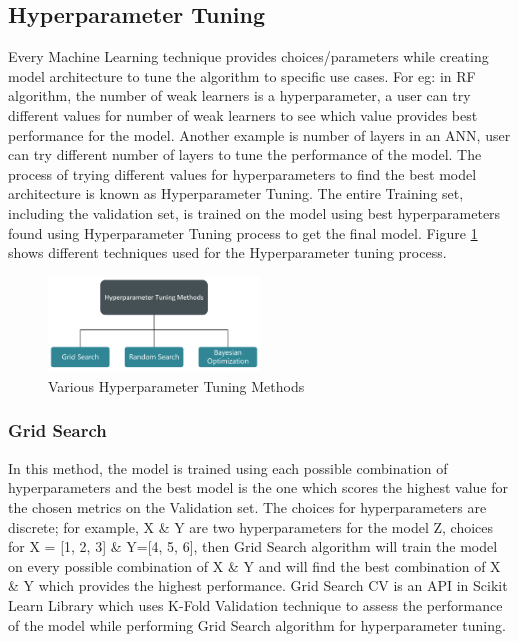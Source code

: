\documentclass[twoside,11pt,a4paper]{article}
\begin{document}
\subsection{Hyperparameter Tuning}
Every Machine Learning technique provides choices/parameters while creating model architecture to tune the algorithm to specific use cases. For eg: in \acf{RF} algorithm, the number of weak learners is a hyperparameter, a user can try different values for number of weak learners to see which value provides best performance for the model. Another example is number of layers in an \acf{ANN}, user can try different number of layers to tune the performance of the model. The process of trying different values for hyperparameters to find the best model architecture is known as Hyperparameter Tuning. The entire Training set, including the validation set, is trained on the model using best hyperparameters found using Hyperparameter Tuning process to get the final model. Figure \ref{fig:hyperparameter_tuning_methods} shows different techniques used for the Hyperparameter tuning process.\\
\begin{figure}[ht]
	\centering
	\includegraphics[width=0.5\textwidth]{hyperparameter_tuning_methods}
	\caption[Various Hyperparameter Tuning Methods]{Various Hyperparameter Tuning Methods}
	\label{fig:hyperparameter_tuning_methods}
\end{figure}
\FloatBarrier

\subsubsection{Grid Search} \label{sec:grid_search}
In this method, the model is trained using each possible combination of hyperparameters and the best model is the one which scores the highest value for the chosen metrics on the Validation set. The choices for hyperparameters are discrete; for example, X \& Y  are two hyperparameters for the model Z, choices for X = [1, 2, 3] \& Y=[4, 5, 6], then Grid Search algorithm will train the model on every possible combination of X \& Y and will find the best combination of X \& Y which provides the highest performance. Grid Search \acs{CV} is an API in Scikit Learn Library which uses K-Fold Validation technique to assess the performance of the model while performing Grid Search algorithm for hyperparameter tuning.
\end{document}
